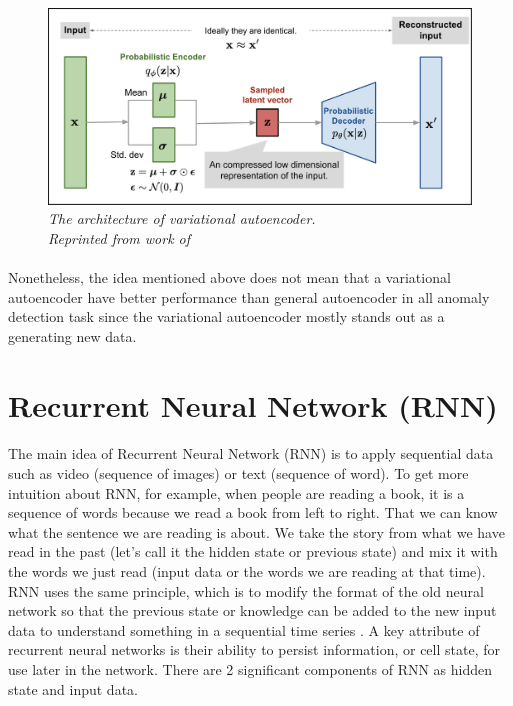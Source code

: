 \begin{figure}[H]
  \centering
  \caption[The architecture of variational autoencoder.]{\emph{The architecture of variational autoencoder. \\
  Reprinted from work of \citeauthor{weng_2018} \citeyear{weng_2018}}}\label{fig:VAE}
  \includegraphics[scale = 0.15]{figures/VAE.jpg}  
\end{figure}

\paragraph{}
Nonetheless, the idea mentioned above does not mean that a variational autoencoder have better performance than general autoencoder in all anomaly detection task \cite{agmon_2021} since the variational autoencoder mostly stands out as a generating new data.


\section{Recurrent Neural Network (RNN)}
\paragraph{}
The main idea of Recurrent Neural Network (RNN) is to apply sequential data such as video (sequence of images) or text (sequence of word). To get more intuition about RNN, for example, when people are reading a book, it is a sequence of words because we read a book from left to right. That we can know what the sentence we are reading is about. We take the story from what we have read in the past (let's call it the hidden state or previous state) and mix it with the words we just read (input data or the words we are reading at that time). RNN uses the same principle, which is to modify the format of the old neural network so that the previous state or knowledge can be added to the new input data to understand something in a sequential time series \cite{donges_2019}. A key attribute of recurrent neural networks is their ability to persist information, or cell state, for use later in the network. There are 2 significant components of RNN as hidden state and input data.


